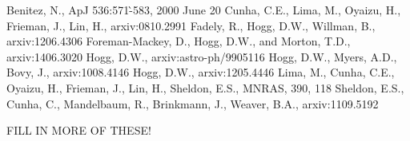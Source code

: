 \documentclass[12pt, onecolumn]{emulateapj}
\begin{document}


\begin{thebibliography}{}
Benitez, N., ApJ 536:571-̀583, 2000 June 20
Cunha, C.E., Lima, M., Oyaizu, H., Frieman, J., Lin, H., arxiv:0810.2991
Fadely, R., Hogg, D.W., Willman, B., arxiv:1206.4306
Foreman-Mackey, D., Hogg, D.W., and Morton, T.D., arxiv:1406.3020
Hogg, D.W., arxiv:astro-ph/9905116
Hogg, D.W., Myers, A.D., Bovy, J., arxiv:1008.4146
Hogg, D.W., arxiv:1205.4446
Lima, M., Cunha, C.E., Oyaizu, H., Frieman, J., Lin, H., Sheldon, E.S., MNRAS, 390, 118
Sheldon, E.S., Cunha, C., Mandelbaum, R., Brinkmann, J., Weaver, B.A., arxiv:1109.5192

FILL IN MORE OF THESE!
\end{thebibliography}
\end{document}
